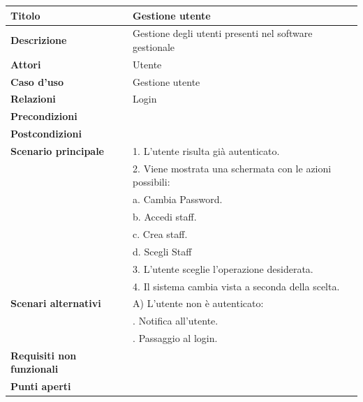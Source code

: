 \documentclass[a4paper]{article}
\begin{document}
\begin{center}
\begin{tabularx}{1\textwidth}{|l|X|}
    \hline
	\textbf{Titolo} & Gestione utente \\
	\hline
	\textbf{Descrizione} & Gestione degli utenti presenti nel software gestionale \\
	\hline
	\textbf{Attori} & Utente \\
	\hline
	\textbf{Caso d'uso} & Gestione utente \\
	\hline
	\textbf{Relazioni} & Login \\
	\hline
	\textbf{Precondizioni} &  \\
	\hline
	\textbf{Postcondizioni} &  \\
	\hline
	\textbf{Scenario principale} & 1. L'utente risulta già autenticato.\\
	                             & 2. Viene mostrata una schermata con le azioni possibili:\\
								 & \quad a. Cambia Password.\\
								 & \quad b. Accedi staff.\\
								 & \quad c. Crea staff.\\
								 & \quad d. Scegli Staff\\
								 & 3. L'utente sceglie l'operazione desiderata.\\
								 & 4. Il sistema cambia vista a seconda della scelta.\\
	\hline
	\textbf{Scenari alternativi} & A) L'utente non è autenticato: \\
								 & \quad 1. Notifica all'utente.\\
								 & \quad 2. Passaggio al login.\\
	\hline
	\textbf{Requisiti non funzionali} & \\
	\hline
	\textbf{Punti aperti} & \\
	\hline
\end{tabularx}
\end{center}


\end{document}

